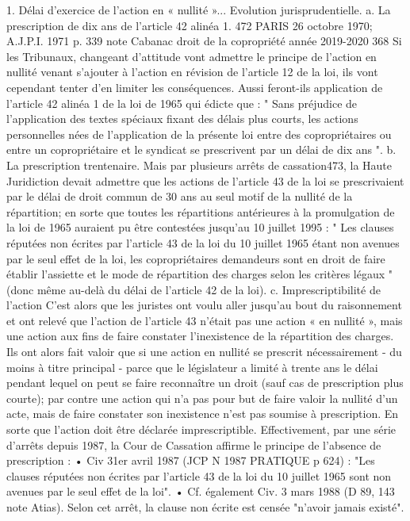 1. Délai d'exercice de l'action en « nullité »... Evolution jurisprudentielle.
a. La prescription de dix ans de l'article 42 alinéa 1.
472 PARIS 26 octobre 1970; A.J.P.I. 1971 p. 339 note Cabanac
droit de la copropriété année 2019-2020
368
Si les Tribunaux, changeant d'attitude vont admettre le principe de l'action en nullité venant s'ajouter à l'action en révision de l'article 12 de la loi, ils vont cependant tenter d'en limiter les conséquences.
Aussi feront-ils application de l'article 42 alinéa 1 de la loi de 1965 qui édicte que :
" Sans préjudice de l'application des textes spéciaux fixant des délais plus courts, les actions personnelles nées de l'application de la présente loi entre des copropriétaires ou entre un copropriétaire et le syndicat se prescrivent par un délai de dix ans ".
b. La prescription trentenaire.
Mais par plusieurs arrêts de cassation473, la Haute Juridiction devait admettre que les actions de l'article 43 de la loi se prescrivaient par le délai de droit commun de 30 ans au seul motif de la nullité de la répartition; en sorte que toutes les répartitions antérieures à la promulgation de la loi de 1965 auraient pu être contestées jusqu'au 10 juillet 1995 :
" Les clauses réputées non écrites par l'article 43 de la loi du 10 juillet 1965 étant non avenues par le seul effet de la loi, les copropriétaires demandeurs sont en droit de faire établir l'assiette et le mode de répartition des charges selon les critères légaux " (donc même au-delà du délai de l'article 42 de la loi).
c. Imprescriptibilité de l'action
C'est alors que les juristes ont voulu aller jusqu'au bout du raisonnement et ont relevé que l'action de l'article 43 n'était pas une action « en nullité », mais une action aux fins de faire constater l'inexistence de la répartition des charges.
Ils ont alors fait valoir que si une action en nullité se prescrit nécessairement - du moins à titre principal - parce que le législateur a limité à trente ans le délai pendant lequel on peut se faire reconnaître un droit (sauf cas de prescription plus courte); par contre une action qui n'a pas pour but de faire valoir la nullité d'un acte, mais de faire constater son inexistence n'est pas soumise à prescription. En sorte que l'action doit être déclarée imprescriptible.
Effectivement, par une série d'arrêts depuis 1987, la Cour de Cassation affirme le principe de l'absence de prescription :
• Civ 3\degres 1er avril 1987 (JCP N 1987 PRATIQUE p 624) :
"Les clauses réputées non écrites par l'article 43 de la loi du 10 juillet 1965 sont non avenues par le seul effet de la loi".
• Cf. également Civ. 3 mars 1988 (D 89, 143 note Atias). Selon cet arrêt, la clause non écrite est censée "n'avoir jamais existé".
